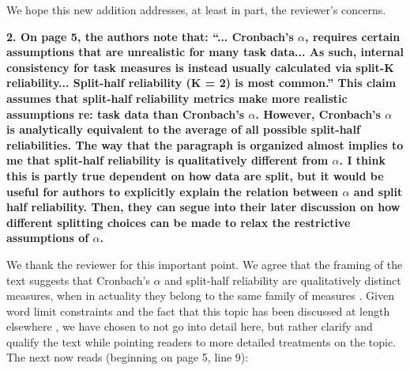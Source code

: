 \documentclass[a4paper,12pt]{article}
\begin{document}
We hope this new addition addresses, at least in part, the reviewer's concerns.

\textbf{2. On page 5, the authors note that: ``... Cronbach's $\alpha$, requires certain assumptions that are unrealistic for many task data... As such, internal consistency for task measures is instead usually calculated via split-K reliability... Split-half reliability (K = 2) is most common.'' This claim assumes that split-half reliability metrics make more realistic assumptions re: task data than Cronbach’s $\alpha$. However, Cronbach’s $\alpha$ is analytically equivalent to the average of all possible split-half reliabilities. The way that the paragraph is organized almost implies to me that split-half reliability is qualitatively different from $\alpha$. I think this is partly true dependent on how data are split, but it would be useful for authors to explicitly explain the relation between $\alpha$ and split half reliability. Then, they can segue into their later discussion on how different splitting choices can be made to relax the restrictive assumptions of $\alpha$.}

We thank the reviewer for this important point. We agree that the framing of the text suggests that Cronbach's $\alpha$ and split-half reliability are qualitatively distinct measures, when in actuality they belong to the same family of measures \cite{Green2016-xw}. Given word limit constraints and the fact that this topic has been discussed at length elsewhere \cite{Green2016-xw}, we have chosen to not go into detail here, but rather clarify and qualify the text while pointing readers to more detailed treatments on the topic. The next now reads (beginning on page 5, line 9):
\end{document}
